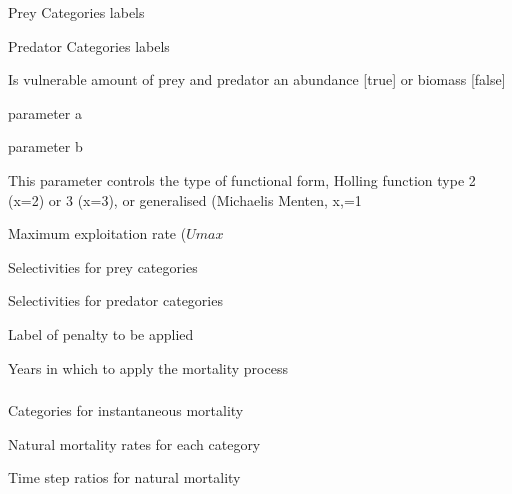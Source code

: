  {Prey Categories labels}

 {Predator Categories labels}

 {Is vulnerable amount of prey and predator an abundance [true] or biomass [false]}

 {parameter a}

 {parameter b}

 {This parameter controls the type of functional form, Holling function type 2 (x=2) or 3 (x=3), or generalised (Michaelis Menten, x,=1}

 {Maximum exploitation rate ($Umax$}

 {Selectivities for prey categories}

 {Selectivities for predator categories}

 {Label of penalty to be applied}

 {Years in which to apply the mortality process}

\subsubsection[Mortality Instantaneous]{}

 {Categories for instantaneous mortality}

 {Natural mortality rates for each category}

 {Time step ratios for natural mortality}

